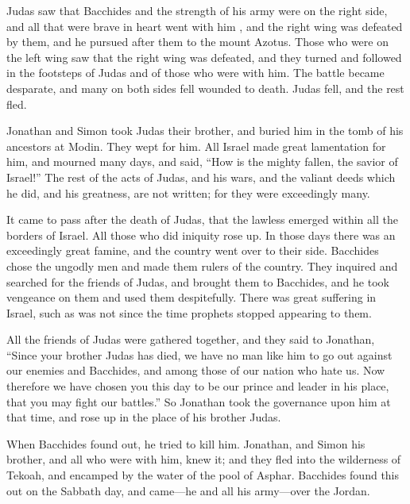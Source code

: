  Judas saw that Bacchides and the strength of his army
were on the right side, and all that were brave in heart went with him ,
 and the right wing was defeated by them, and he pursued
after them to the mount Azotus.  Those who were on the
left wing saw that the right wing was defeated, and they turned and
followed in the footsteps of Judas and of those who were with him.
 The battle became desparate, and many on both sides fell
wounded to death.  Judas fell, and the rest fled.

 Jonathan and Simon took Judas their brother, and buried
him in the tomb of his ancestors at Modin.  They wept for
him. All Israel made great lamentation for him, and mourned many days,
and said,  ``How is the mighty fallen, the savior of
Israel!''  The rest of the acts of Judas, and his wars,
and the valiant deeds which he did, and his greatness, are not written;
for they were exceedingly many.

 It came to pass after the death of Judas, that the
lawless emerged within all the borders of Israel. All those who did
iniquity rose up.  In those days there was an exceedingly
great famine, and the country went over to their side. 
Bacchides chose the ungodly men and made them rulers of the country.
 They inquired and searched for the friends of Judas, and
brought them to Bacchides, and he took vengeance on them and used them
despitefully.  There was great suffering in Israel, such
as was not since the time prophets stopped appearing to them.

 All the friends of Judas were gathered together, and
they said to Jonathan,  ``Since your brother Judas has
died, we have no man like him to go out against our enemies and
Bacchides, and among those of our nation who hate us. 
Now therefore we have chosen you this day to be our prince and leader in
his place, that you may fight our battles.''  So Jonathan
took the governance upon him at that time, and rose up in the place of
his brother Judas.

 When Bacchides found out, he tried to kill him.
 Jonathan, and Simon his brother, and all who were with
him, knew it; and they fled into the wilderness of Tekoah, and encamped
by the water of the pool of Asphar.  Bacchides found this
out on the Sabbath day, and came---he and all his army---over the
Jordan.

